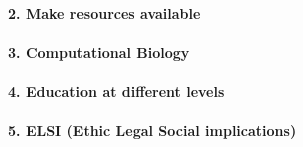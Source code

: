 \paragraph*{2. Make resources available}
\paragraph*{3. Computational Biology}
\paragraph*{4. Education at different levels}
\paragraph*{5. ELSI (Ethic Legal Social implications)}




